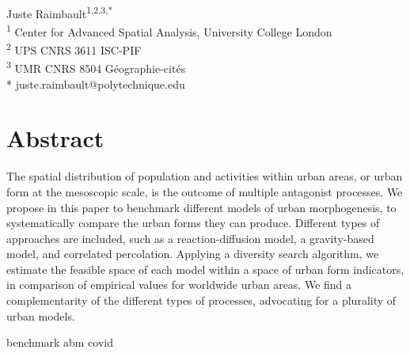 \documentclass[10pt,letterpaper]{article}
\begin{document}
\vspace*{0.2in}

\begin{flushleft}
{\Large
\textbf{} %
}
\newline
\\
Juste Raimbault\textsuperscript{1,2,3,*}
\bigskip\\
\textsuperscript{1} Center for Advanced Spatial Analysis, University College London
\\
\textsuperscript{2} UPS CNRS 3611 ISC-PIF
\\
\textsuperscript{3} UMR CNRS 8504 G{\'e}ographie-cit{\'e}s
\bigskip\\
* juste.raimbault@polytechnique.edu



\end{flushleft}

\section*{Abstract}
\vspace{1cm}
The spatial distribution of population and activities within urban areas, or urban form at the mesoscopic scale, is the outcome of multiple antagonist processes. We propose in this paper to benchmark different models of urban morphogenesis, to systematically compare the urban forms they can produce. Different types of approaches are included, such as a reaction-diffusion model, a gravity-based model, and correlated percolation. Applying a diversity search algorithm, we estimate the feasible space of each model within a space of urban form indicators, in comparison of empirical values for worldwide urban areas. We find a complementarity of the different types of processes, advocating for a plurality of urban models.



\linenumbers


\cite{bithellsystematic} benchmark abm covid
\end{document}
